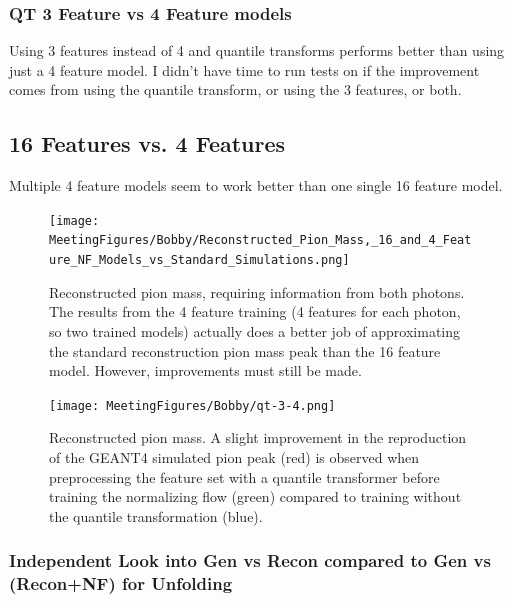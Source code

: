 \subsubsection{QT 3 Feature vs 4 Feature models}
Using 3 features instead of 4 and quantile transforms performs better than using just a 4 feature model. I didn't have time to run tests on if the improvement comes from using the quantile transform, or using the 3 features, or both.


\subsection{16 Features vs. 4 Features }
Multiple 4 feature models seem to work better than one single 16 feature model.

\begin{figure}[!ht]
\centering
\texttt{[image: MeetingFigures/Bobby/Reconstructed\_Pion\_Mass,\_16\_and\_4\_Feature\_NF\_Models\_vs\_Standard\_Simulations.png]}
\label{fig: jul8_pion_comparison}
\caption{Reconstructed pion mass, requiring information from both photons. The results from the 4 feature training (4 features for each photon, so two trained models) actually does a better job of approximating the standard reconstruction pion mass peak than the 16 feature model. However, improvements must still be made. }
\end{figure}


\begin{figure}[!ht]
\centering
\texttt{[image: MeetingFigures/Bobby/qt-3-4.png]}
\label{fig: jul8_pion_comparison}
\caption{Reconstructed pion mass. A slight improvement in the reproduction of the GEANT4 simulated pion peak (red) is observed when preprocessing the feature set with a quantile transformer before training the normalizing flow (green) compared to training without the quantile transformation (blue). }
\end{figure}




\subsubsection{Independent Look into Gen vs Recon compared to Gen vs (Recon+NF) for Unfolding}


